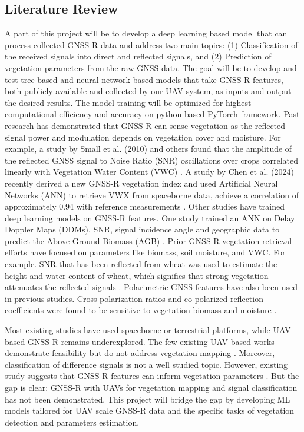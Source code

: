 \documentclass[12pt, a4paper]{article}
\begin{document}
\subsection{Literature Review}
A part of this project will be to develop a deep learning based model that can
process collected GNSS-R data and address two main topics: (1) Classification of
the received signals into direct and reflected signals, and (2) Prediction of
vegetation parameters from the raw GNSS data. The goal will be to develop and
test tree based and neural network based models that take GNSS-R features, both
publicly available and collected by our UAV system, as inputs and output the
desired results. The model training will be optimized for highest computational
efficiency and accuracy on python based PyTorch framework. Past research has
demonstrated that GNSS-R can sense vegetation as the reflected signal power and
modulation depends on vegetation cover and moisture. For example, a study by
Small et al. (2010) and others found that the amplitude of the reflected GNSS
signal to Noise Ratio (SNR) oscillations over crops correlated linearly with
Vegetation Water Content (VWC) \cite{small2010sensing}. A study by Chen et al.
(2024) recently derived a new GNSS-R vegetation index and used Artificial Neural
Networks (ANN) to retrieve VWX from spaceborne data, achieve a correlation of
approximately 0.94 with reference measurements \cite{chen2024new}. Other studies
have trained deep learning models on GNSS-R features. One study trained an ANN on
Delay Doppler Maps (DDMs), SNR, signal incidence angle and geographic data to
predict the Above Ground Biomass (AGB) \cite{pilikos2024biomass}. Prior GNSS-R
vegetation retrieval efforts have focused on parameters like biomass, soil
moisture, and VWC. For example. SNR that has been reflected from wheat was used
to estimate the height and water content of wheat, which signifies that strong
vegetation attenuates the reflected signals \cite{zhang2017use}. Polarimetric
GNSS features have also been used in previous studies. Cross polarization ratios
and co polarized reflection coefficients were found to be sensitive to
vegetation biomass and moisture \cite{wu2021recent}. 

Most existing studies have used spaceborne or terrestrial platforms, while UAV
based GNSS-R remains underexplored. The few existing UAV based works demonstrate
feasibility but do not address vegetation mapping
\cite{wu2021recent,chen2024new}. Moreover, classification of difference signals
is not a well studied topic. However, existing study suggests that GNSS-R
features can inform vegetation parameters \cite{small2010sensing}. But the gap
is clear: GNSS-R with UAVs for vegetation mapping and signal classification has
not been demonstrated. This project will bridge the gap by developing ML models
tailored for UAV scale GNSS-R data and the specific tasks of vegetation
detection and parameters estimation. 
\end{document}
